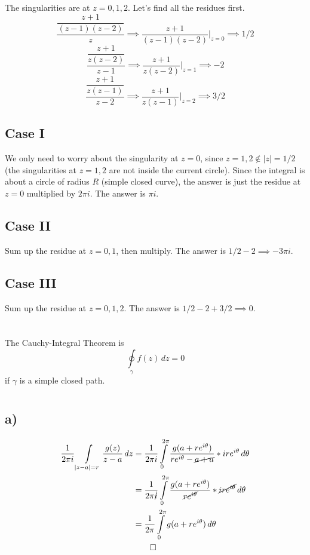 \documentclass[12pt]{article}
\begin{document}
\section{}
The singularities are at $ z = 0, 1, 2 $. Let's find all the residues first. 
\[ \dfrac{\dfrac{z+1}{(z-1)(z-2)}}{z} \implies \dfrac{z+1}{(z-1)(z-2)}\Bigg|_{z=0} \implies 1/2 \]
\[ \dfrac{\dfrac{z+1}{z(z-2)}}{z-1} \implies \dfrac{z+1}{z(z-2)}\Bigg|_{z=1} \implies -2 \]
\[ \dfrac{\dfrac{z+1}{z(z-1)}}{z-2} \implies \dfrac{z+1}{z(z-1)}\Bigg|_{z=2} \implies 3/2 \]
\subsection{Case I}
We only need to worry about the singularity at $ z = 0 $, since $ z = 1,2 \not\in |z|=1/2 $ (the singularities at $ z=1,2 $ are not inside the current circle). Since the integral is about a circle of radius $ R $ (simple closed curve), the answer is just the residue at $ z = 0 $ multiplied by $ 2\pi i $. The answer is $ \boxed{\pi i} $.

\subsection{Case II}
Sum up the residue at $ z = 0, 1 $, then multiply. The answer is $ 1/2-2 \implies \boxed{-3\pi i} $.

\subsection{Case III}
Sum up the residue at $ z = 0, 1, 2 $. The answer is $ 1/2 - 2 +3/2 \implies \boxed{0} $.
\newpage

\section{}
The Cauchy-Integral Theorem is \[ \oint\limits_{\gamma} f(z) \, dz = 0\]
if $ \gamma $ is a simple closed path.
\newpage

\section{}
\subsection{a)}
\begin{align*}
	\dfrac{1}{2\pi i} \int\limits_{|z-a|=r} \dfrac{g(z)}{z-a} \,dz &= \dfrac{1}{2\pi i} \int\limits_{0}^{2\pi} \dfrac{g(a + re^{i\theta})}{re^{i\theta} - \cancel{a + a}} *ire^{i\theta} \,d\theta\\
	&= \dfrac{1}{2\pi \cancel{i}} \int\limits_{0}^{2\pi} \dfrac{g(a + re^{i\theta})}{\cancel{re^{i\theta}}} *\cancel{ire^{i\theta}} \,d\theta\\
	&= \dfrac{1}{2\pi} \int\limits_{0}^{2\pi} g(a + re^{i\theta}) \,d\theta\\
	&\qed
\end{align*}
\end{document}
